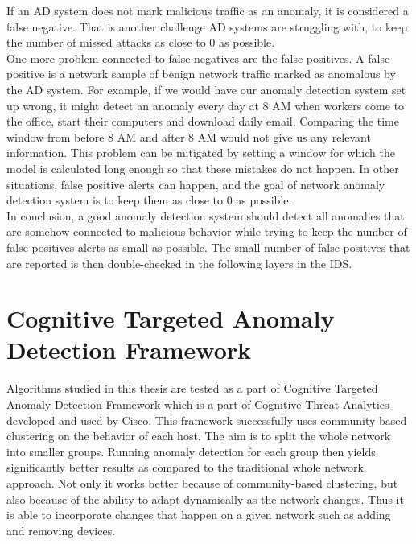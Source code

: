 \documentclass[thesis=B,english]{FITthesis}[2012/10/20]
\begin{document}
If an AD system does not mark malicious traffic as an anomaly, it is considered a false negative.
That is another challenge AD systems are struggling with, to keep the number of missed attacks as close to 0 as possible. \\

One more problem connected to false negatives are the false positives.
A false positive is a network sample of benign network traffic marked as anomalous by the AD system.
For example, if we would have our anomaly detection system set up wrong, it might detect an anomaly every day at 8 AM when workers come to the office, start their computers and download daily email.
Comparing the time window from before 8 AM and after 8 AM would not give us any relevant information.
This problem can be mitigated by setting a window for which the model is calculated long enough so that these mistakes do not happen.
In other situations, false positive alerts can happen, and the goal of network anomaly detection system is to keep them as close to 0 as possible. \\

In conclusion, a good anomaly detection system should detect all anomalies that are somehow connected to malicious behavior while trying to keep the number of false positives alerts as small as possible.
The small number of false positives that are reported is then double-checked in the following layers in the IDS.

\section{Cognitive Targeted Anomaly Detection Framework}\label{sec:ctadf}                         
                                             
Algorithms studied in this thesis are tested as a part of Cognitive Targeted Anomaly Detection Framework which is a part of Cognitive Threat Analytics developed and used by Cisco.
This framework successfully uses community-based clustering on the behavior of each host.
The aim is to split the whole network into smaller groups.
Running anomaly detection for each group then yields significantly better results as compared to the traditional whole network approach.
Not only it works better because of community-based clustering, but also because of the ability to adapt dynamically as the network changes.
Thus it is able to incorporate changes that happen on a given network such as adding and removing devices.\\
                                                                                  
\end{document}

